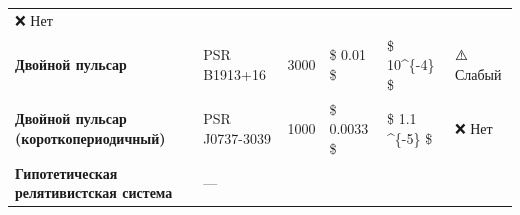 \documentclass[11pt]{article}
\begin{document}
\begin{longtable}[]{@{}llllll@{}}
\begin{minipage}[t]{0.19\columnwidth}
❌ Нет\strut
\end{minipage}\tabularnewline
\begin{minipage}[t]{0.11\columnwidth}\raggedright\strut
\textbf{Двойной пульсар}\strut
\end{minipage} & \begin{minipage}[t]{0.09\columnwidth}\raggedright\strut
PSR B1913+16\strut
\end{minipage} & \begin{minipage}[t]{0.14\columnwidth}\raggedright\strut
3000\strut
\end{minipage} & \begin{minipage}[t]{0.09\columnwidth}\raggedright\strut
\$ 0.01 \$\strut
\end{minipage} & \begin{minipage}[t]{0.21\columnwidth}\raggedright\strut
\$ 10\^{}\{-4\} \$\strut
\end{minipage} & \begin{minipage}[t]{0.19\columnwidth}\raggedright\strut
⚠️ Слабый\strut
\end{minipage}\tabularnewline
\begin{minipage}[t]{0.11\columnwidth}\raggedright\strut
\textbf{Двойной пульсар (короткопериодичный)}\strut
\end{minipage} & \begin{minipage}[t]{0.09\columnwidth}\raggedright\strut
PSR J0737-3039\strut
\end{minipage} & \begin{minipage}[t]{0.14\columnwidth}\raggedright\strut
1000\strut
\end{minipage} & \begin{minipage}[t]{0.09\columnwidth}\raggedright\strut
\$ 0.0033 \$\strut
\end{minipage} & \begin{minipage}[t]{0.21\columnwidth}\raggedright\strut
\$ 1.1 \times 10\^{}\{-5\} \$\strut
\end{minipage} & \begin{minipage}[t]{0.19\columnwidth}\raggedright\strut
❌ Нет\strut
\end{minipage}\tabularnewline
\begin{minipage}[t]{0.11\columnwidth}\raggedright\strut
\textbf{Гипотетическая релятивистская система}\strut
\end{minipage} & \begin{minipage}[t]{0.09\columnwidth}\raggedright\strut
---\strut
\end{minipage} & \begin{minipage}[t]{0.14\columnwidth}\raggedright\strut

\end{minipage}
\end{longtable}
\end{document}
